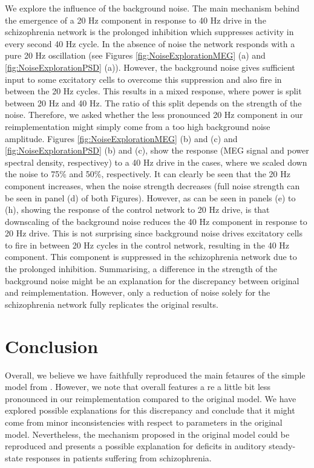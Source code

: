 \documentclass[10pt,a4paper,onecolumn]{article}
\begin{document}
We explore the influence of the background noise. The main mechanism behind the emergence of a 20 Hz component in response
to 40 Hz drive in the schizophrenia network is the prolonged inhibition which suppresses activity in every second 40 Hz cycle. In the absence
of noise the network responds with a pure 20 Hz oscillation (see Figures \ref{fig:NoiseExplorationMEG} (a) and \ref{fig:NoiseExplorationPSD} (a)). However, the background noise
gives sufficient input to some excitatory cells to overcome this suppression and also fire in between the 20 Hz cycles. This results in a mixed response, 
where power is split between 20 Hz and 40 Hz. The ratio of this split depends on the strength of the noise. Therefore, we asked whether the less pronounced
20 Hz component in our reimplementation might simply come from a too high background noise amplitude. Figures \ref{fig:NoiseExplorationMEG} (b) and (c) and \ref{fig:NoiseExplorationPSD} (b) and (c), show the 
response (MEG signal and power spectral density, respectivey) to a 40 Hz drive in the cases, where we scaled down the noise to 75\% and 50\%, respectively. It can clearly be seen that the 20 Hz component increases, when
the noise strength decreases (full noise strength can be seen in panel (d) of both Figures). However, as can be seen in panels (e) to (h), showing the response of the control network to 20 Hz drive,
is that downscaling of the background noise reduces the 40 Hz component in response to 20 Hz drive. This is not surprising since background noise drives excitatory cells to fire in between 20 Hz cycles in the control network, resulting
in the 40 Hz component. This component is suppressed in the schizophrenia network due to the prolonged inhibition.
Summarising, a difference in the strength of the background noise might be an explanation for the discrepancy between original and reimplementation. However, only a reduction of noise solely for the schizophrenia network 
fully replicates the original results. 

\section{Conclusion}\label{conclusion}

Overall, we believe we have faithfully reproduced the main fetaures of
the simple model from \autocite{Vierling2008}. However, we note that
overall features a re a little bit less pronounced in our
reimplementation compared to the original model. We have explored possible explanations for this discrepancy
and conclude that it might come from minor inconsistencies with respect to parameters in the original model. Nevertheless,
the mechanism proposed in the original model could be reproduced and presents a possible explanation for deficits in 
auditory steady-state responses in patients suffering from schizophrenia.

{\sffamily \small
  \printbibliography[title=References]
}
\end{document}

